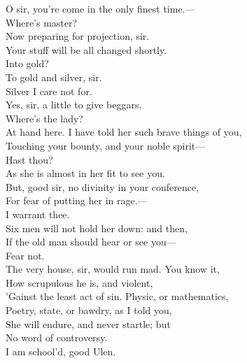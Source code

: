 \documentclass[a4paper,oneside]{memoir}
\begin{document}
\begin{drama*}
\scene

\facespeaks O sir, you're come in the only finest time.---\\
\mammonspeaks Where's master?\\
\facespeaks {} Now preparing for projection, sir.\\
Your stuff will be all changed shortly.\\
\mammonspeaks {} Into gold?\\
\facespeaks To gold and silver, sir.\\
\mammonspeaks {} Silver I care not for.\\
\facespeaks Yes, sir, a little to give beggars.\\
\mammonspeaks {} Where's the lady?\\
\facespeaks At hand here. I have told her such brave things of you,\\
Touching your bounty, and your noble spirit---\\
\mammonspeaks Hast thou?\\
\facespeaks {} As she is almost in her fit to see you.\\
But, good sir, no divinity in your conference,\\
For fear of putting her in rage.---\\
\mammonspeaks {} I warrant thee.\\
\facespeaks Six men  will not hold her down: and then,\\
If the old man should hear or see you---\\
\mammonspeaks {} Fear not.\\
\facespeaks The very house, sir, would run mad. You know it,\\
How scrupulous he is, and violent,\\
'Gainst the least act of sin. Physic, or mathematics,\\
Poetry, state, or bawdry, as I told you,\\
She will endure, and never startle; but\\
No word of controversy.\\
\mammonspeaks {} I am school'd, good Ulen.\\

\end{drama*}
\end{document}
